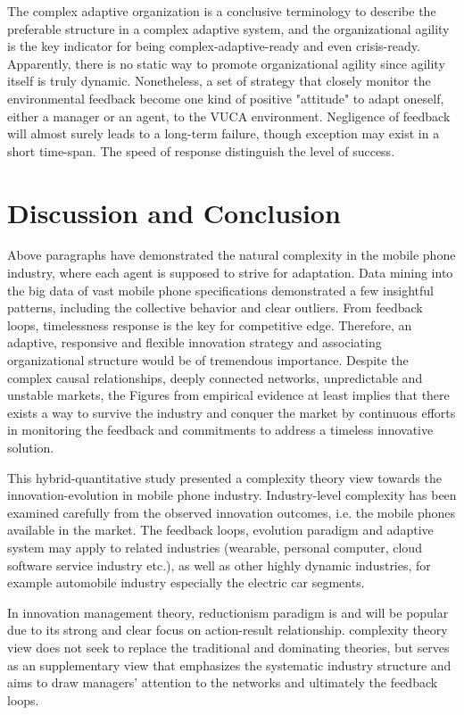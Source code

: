 \documentclass[utf8,english]{gradu3}
\begin{document}
The complex adaptive organization is a conclusive terminology to describe the preferable structure in a complex adaptive system, and the organizational agility is the key indicator for being complex-adaptive-ready and even crisis-ready. Apparently, there is no static way to promote organizational agility since agility itself is truly dynamic. Nonetheless, a set of strategy that closely monitor the environmental feedback become one kind of positive "attitude" to adapt oneself, either a manager or an agent, to the VUCA environment. Negligence of feedback will almost surely leads to a long-term failure, though exception may exist in a short time-span. The speed of response distinguish the level of success.

\chapter{Discussion and Conclusion}

Above paragraphs have demonstrated the natural complexity in the mobile phone industry, where each agent is supposed to strive for adaptation. Data mining into the big data of vast mobile phone specifications demonstrated a few insightful patterns, including the collective behavior and clear outliers. From feedback loops, timelessness response is the key for competitive edge. Therefore, an adaptive, responsive and flexible innovation strategy and associating organizational structure would be of tremendous importance. Despite the complex causal relationships, deeply connected networks, unpredictable and unstable markets, the Figures from empirical evidence at least implies that there exists a way to survive the industry and conquer the market by continuous efforts in monitoring the feedback and commitments to address a timeless innovative solution. 

This hybrid-quantitative study presented a complexity theory view towards the innovation-evolution in mobile phone industry. Industry-level complexity has been examined carefully from the observed innovation outcomes, i.e. the mobile phones available in the market. The feedback loops, evolution paradigm and adaptive system may apply to related industries (wearable, personal computer, cloud software service industry etc.), as well as other highly dynamic industries, for example automobile industry especially the electric car segments. 

In innovation management theory, reductionism paradigm is and will be popular due to its strong and clear focus on action-result relationship. complexity theory view does not seek to replace the traditional and dominating theories, but serves as an supplementary view that emphasizes the systematic industry structure and aims to draw managers' attention to the networks and ultimately the feedback loops.
\end{document}
